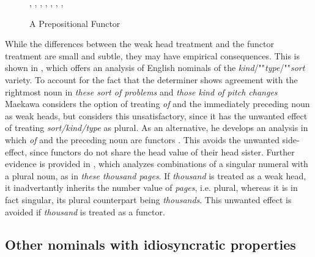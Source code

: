 \documentclass[output=paper]{langsci/langscibook}
\begin{document}
\begin{figure}
\begin{center}
\footnotesize
\tree
{,
  {,
    {}},
  {,
    {,
      {}},  
    {,
      {}}}}
\normalsize
\caption{\label{beau} A Prepositional Functor }
\end{center}
\end{figure}

While the differences between the weak head treatment and the functor treatment are small and subtle, 
they may have empirical consequences. This is shown in \citet{Maekawa15}, which offers 
an analysis of English nominals of the \emph{kind}/""\emph{type}/""\emph{sort} variety.  
To account for the fact that the determiner shows agreement with the 
rightmost noun in \emph{these sort of problems} and \emph{those kind of pitch changes}
Maekawa considers the option of treating \emph{of} and the immediately preceding noun as 
weak heads, but considers this unsatisfactory, since it has the unwanted effect of treating 
\emph{sort/kind/type} as plural. As an alternative, he develops an analysis in which \emph{of} and 
the preceding noun are functors \citep[149]{Maekawa15}. This avoids the unwanted side-effect, 
since functors do not share the {\sc head} value of their head sister. 
Further evidence is provided in \citet{Maekawa16}, which analyzes combinations of a   
singular numeral with a plural noun, as in \emph{these thousand pages}. If 
\emph{thousand} is treated as a weak head, it inadvertantly inherits the number value of
\emph{pages}, i.e. plural, whereas it is in fact singular, its plural counterpart being 
\emph{thousands}. This unwanted effect is avoided if \emph{thousand} is treated as a functor.


\subsection{Other nominals with idiosyncratic properties} 
\end{document}
